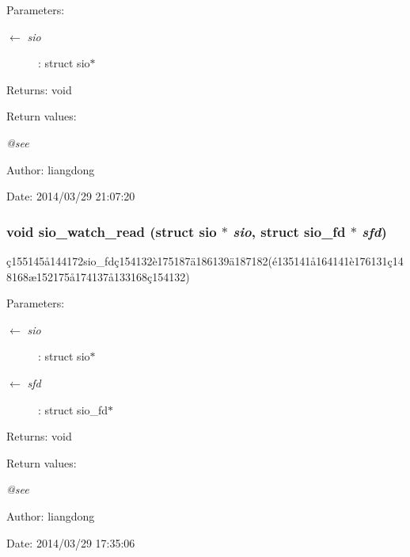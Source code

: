 \begin{Desc}
\item[Parameters:]
\begin{description}
\item[\mbox{$\leftarrow$} {\em sio}]: struct sio$\ast$ \end{description}
\end{Desc}
\begin{Desc}
\item[Returns:]void \end{Desc}
\begin{Desc}
\item[Return values:]
\begin{description}
\item[{\em @see}]\end{description}
\end{Desc}
\begin{Desc}
\item[Author:]liangdong \end{Desc}
\begin{Desc}
\item[Date:]2014/03/29 21:07:20 \end{Desc}
\subsubsection{\setlength{\rightskip}{0pt plus 5cm}void sio\_\-watch\_\-read (struct sio $\ast$ {\em sio}, struct sio\_\-fd $\ast$ {\em sfd})}\label{sio_8h_a11}


\c{c}155145\aa{}144172sio\_\-fd\c{c}154132\`{e}175187\"{a}186139\"{a}187182(\'{e}135141\aa{}164141\`{e}176131\c{c}148168\ae{}152175\aa{}174137\aa{}133168\c{c}154132) 

\begin{Desc}
\item[Parameters:]
\begin{description}
\item[\mbox{$\leftarrow$} {\em sio}]: struct sio$\ast$ \item[\mbox{$\leftarrow$} {\em sfd}]: struct sio\_\-fd$\ast$ \end{description}
\end{Desc}
\begin{Desc}
\item[Returns:]void \end{Desc}
\begin{Desc}
\item[Return values:]
\begin{description}
\item[{\em @see}]\end{description}
\end{Desc}
\begin{Desc}
\item[Author:]liangdong \end{Desc}
\begin{Desc}
\item[Date:]2014/03/29 17:35:06 \end{Desc}
